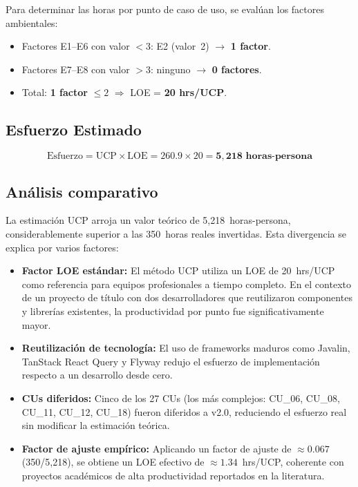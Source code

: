 Para determinar las horas por punto de caso de uso, se evalúan los factores ambientales:
\begin{itemize}
    \item Factores E1--E6 con valor $< 3$: E2 (valor~2) $\rightarrow$ \textbf{1 factor}.
    \item Factores E7--E8 con valor $> 3$: ninguno $\rightarrow$ \textbf{0 factores}.
    \item Total: \textbf{1 factor} $\leq 2$ $\Rightarrow$ LOE = \textbf{20 hrs/UCP}.
\end{itemize}

\subsection{Esfuerzo Estimado}

\[
\text{Esfuerzo} = \text{UCP} \times \text{LOE} = 260.9 \times 20 = \mathbf{5{,}218 \text{ horas-persona}}
\]

\subsection{Análisis comparativo}

La estimación UCP arroja un valor teórico de 5{,}218~horas-persona, considerablemente superior a las 350~horas reales invertidas. Esta divergencia se explica por varios factores:

\begin{itemize}
    \item \textbf{Factor LOE estándar:} El método UCP utiliza un LOE de 20~hrs/UCP como referencia para equipos profesionales a tiempo completo. En el contexto de un proyecto de título con dos desarrolladores que reutilizaron componentes y librerías existentes, la productividad por punto fue significativamente mayor.

    \item \textbf{Reutilización de tecnología:} El uso de frameworks maduros como Javalin, TanStack React Query y Flyway redujo el esfuerzo de implementación respecto a un desarrollo desde cero.

    \item \textbf{CUs diferidos:} Cinco de los 27 CUs (los más complejos: CU\_06, CU\_08, CU\_11, CU\_12, CU\_18) fueron diferidos a v2.0, reduciendo el esfuerzo real sin modificar la estimación teórica.

    \item \textbf{Factor de ajuste empírico:} Aplicando un factor de ajuste de $\approx 0.067$ (350/5{,}218), se obtiene un LOE efectivo de $\approx 1.34$~hrs/UCP, coherente con proyectos académicos de alta productividad reportados en la literatura.
\end{itemize}

